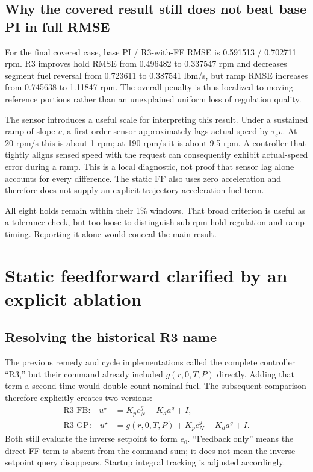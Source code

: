 \subsection{Why the covered result still does not beat base PI in full RMSE}
For the final covered case, base PI / R3-with-FF RMSE is 0.591513 / 0.702711 rpm. R3 improves hold RMSE from 0.496482 to 0.337547 rpm and decreases segment fuel reversal from 0.723611 to 0.387541 lbm/s, but ramp RMSE increases from 0.745638 to 1.11847 rpm. The overall penalty is thus localized to moving-reference portions rather than an unexplained uniform loss of regulation quality.

The sensor introduces a useful scale for interpreting this result. Under a sustained ramp of slope $v$, a first-order sensor approximately lags actual speed by $\tau_sv$. At 20 rpm/s this is about 1 rpm; at 190 rpm/s it is about 9.5 rpm. A controller that tightly aligns sensed speed with the request can consequently exhibit actual-speed error during a ramp. This is a local diagnostic, not proof that sensor lag alone accounts for every difference. The static FF also uses zero acceleration and therefore does not supply an explicit trajectory-acceleration fuel term.

All eight holds remain within their 1\% windows. That broad criterion is useful as a tolerance check, but too loose to distinguish sub-rpm hold regulation and ramp timing. Reporting it alone would conceal the main result.




\section{Static feedforward clarified by an explicit ablation}
\subsection{Resolving the historical R3 name}
The previous remedy and cycle implementations called the complete controller ``R3,'' but their command already included $g(r,0,T,P)$ directly. Adding that term a second time would double-count nominal fuel. The subsequent comparison therefore explicitly creates two versions:
\begin{align}
\text{R3-FB:}\quad u^\star&=K_pe_N^g-K_da^g+I,\\
\text{R3-GP:}\quad u^\star&=g(r,0,T,P)+K_pe_N^g-K_da^g+I.
\end{align}
Both still evaluate the inverse setpoint to form $e_0$. ``Feedback only'' means the direct FF term is absent from the command sum; it does not mean the inverse setpoint query disappears. Startup integral tracking is adjusted accordingly.

